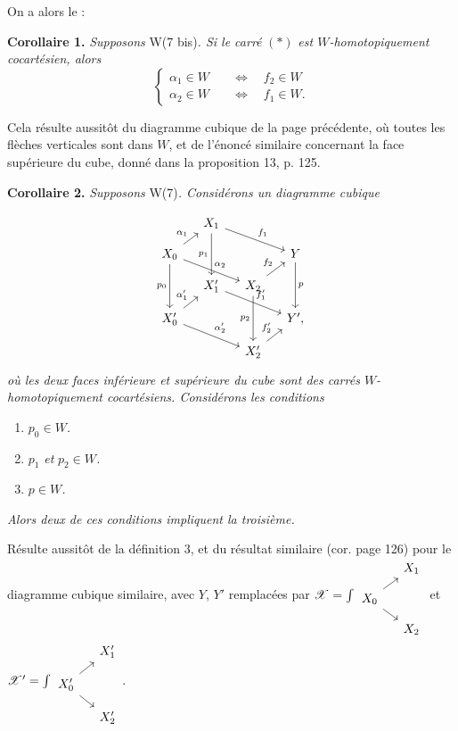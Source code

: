 \documentclass[11pt]{article}
\newcommand{\printedpage}[1]{\marginpar{\footnotesize p.~#1}}
\newcommand{\msp}[1]{\marginpar{\footnotesize [#1]}}
\newcommand{\sX}{\mathscr{X}}
\begin{document}
\msp{page 132}
On a alors le :

\textbf{Corollaire 1.} \textit{Supposons} W(7 bis)\textit{. Si le carré} $(*)$ \textit{est $W$-homotopiquement cocartésien, alors}
\[
\left\{
\begin{aligned}
\alpha_1 \in W &\quad\iff\quad f_2 \in W \\
\alpha_2 \in W &\quad\iff\quad f_1 \in W.
\end{aligned}
\right.
\]

Cela résulte aussitôt du diagramme cubique de la page précédente, où toutes les flèches verticales sont dans $W$, et de l'énoncé similaire concernant la face supérieure du cube, donné dans la proposition 13, p. 125.

\textbf{Corollaire 2.} \textit{Supposons} W(7)\textit{. Considérons un diagramme cubique}

\printedpage{90}
\[
\begin{tikzcd}[row sep=small, column sep=small]
 & X_1 \arrow[dd, "p_1"'] \arrow[rrd, "f_1"] & & \\
X_0 \arrow[ru, "\alpha_1"] \arrow[rrd, "\alpha_2"] \arrow[dd, "p_0"'] & & & Y \arrow[dd, "p"] \\
 & X'_1 \arrow[rrd, "f'_1"] & X_2 \arrow[ru, "f_2"] \arrow[dd, "p_2"'] & \\
X'_0 \arrow[ru, "\alpha'_1"] \arrow[rrd, "\alpha'_2"] & & & Y', \\
 & & X'_2 \arrow[ru, "f'_2"] &
\end{tikzcd}
\]
\textit{où les deux faces inférieure et supérieure du cube sont des carrés $W$-homotopiquement cocartésiens. Considérons les conditions}

\msp{page 133}
\begin{enumerate}[label={}]
\item[\textit{a)}] $p_0 \in W$\textit{.}
\item[\textit{b)}] $p_1$ \textit{et} $p_2 \in W$\textit{.}
\item[\textit{c)}] $p \in W$\textit{.}
\end{enumerate}

\textit{Alors deux de ces conditions impliquent la troisième.}

Résulte aussitôt de la définition 3, et du résultat similaire (cor. page 126) pour le diagramme cubique similaire, avec $Y$, $Y'$ remplacées par $\sX = \int
\begin{tikzcd}[row sep=small, column sep=small]
 & X_1 \\
X_0 \arrow[ur] \arrow[dr] & \\
 & X_2
\end{tikzcd}$
et $\sX' = \int
\begin{tikzcd}[row sep=small, column sep=small]
 & X'_1 \\
X'_0 \arrow[ur] \arrow[dr] & \\
 & X'_2
\end{tikzcd}$\;.
\end{document}
